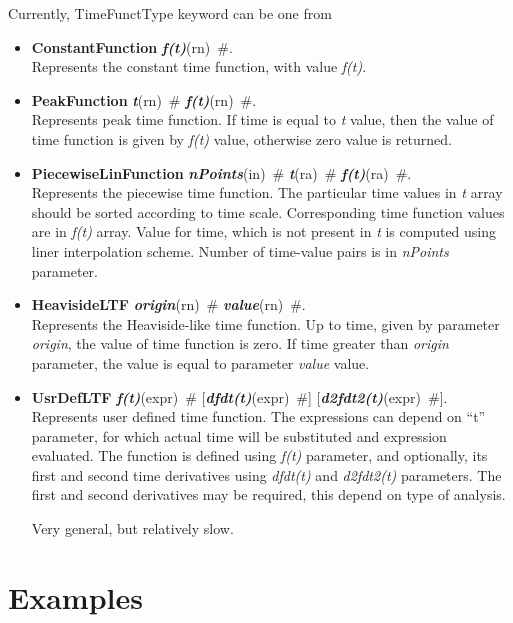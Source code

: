 \documentclass[draft]{article}
\newcommand{\param}[1]{{\em #1}}
\newcommand{\keywordnotype}[1]{\mbox{{\it{\bf{#1}}}}}
\newcommand{\keyword}[2]{\mbox{{\keywordnotype{#1}\tiny (#2)}}}
\newcommand{\entKeywordInst}[1]{\mbox{{\bf{{#1}}}}}
\newcommand{\field}[2]{\mbox{\keyword{#1}{#2}~\#}}
\newcommand{\optField}[2]{\mbox{[\field{#1}{#2}]}}
\begin{document}
Currently, TimeFunctType keyword can be one from
\begin{itemize}
\item \entKeywordInst{ConstantFunction} \field{f(t)}{rn}.\\
Represents the constant time function, with value \param{f(t)}.
\item \entKeywordInst{PeakFunction} \field{t}{rn}
\field{f(t)}{rn}.\\
Represents peak time function. If time is equal to \param{t}
value, then the value of time function is given by \param{f(t)} value,
otherwise zero value is returned.
\item \entKeywordInst{PiecewiseLinFunction} \field{nPoints}{in}
\field{t}{ra} \field{f(t)}{ra}.\\
Represents the piecewise time function. The particular time values in
\param{t} array  should be sorted according to time scale. Corresponding time
function values are in \param{f(t)} array. Value for time, which
is not present in \param{t} is computed using liner interpolation scheme.
Number of time-value pairs is in \param{nPoints} parameter.
\item \entKeywordInst{HeavisideLTF} \field{origin}{rn}
\field{value}{rn}.\\
Represents the Heaviside-like time function. Up to time, given by
parameter \param{origin}, the value of time function is zero. If time
greater than \param{origin} parameter, the value is
equal to parameter \param{value} value.
\item \entKeywordInst{UsrDefLTF} \field{f(t)}{expr}
  \optField{dfdt(t)}{expr} \optField{d2fdt2(t)}{expr}.\\
Represents user defined time function. The expressions can depend on
  ``t'' parameter, for which actual time will be substituted and
expression evaluated. The function is defined using \param{f(t)}
  parameter, and optionally, its first and second time derivatives 
  using \param{dfdt(t)} and \param{d2fdt2(t)} parameters. 
The first and second derivatives may be required, this depend on type
  of analysis.

Very general, but relatively slow.
\end{itemize}

\section{Examples}
\end{document}
